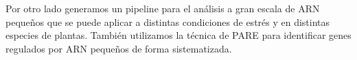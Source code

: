 Por otro lado generamos un pipeline para el análisis a gran escala de ARN pequeños que se puede aplicar a distintas condiciones de estrés y en distintas especies de plantas.
También utilizamos la técnica de PARE para identificar genes regulados por ARN pequeños de forma sistematizada.


